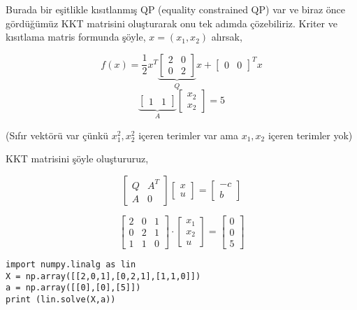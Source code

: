 \documentclass[12pt,fleqn]{article}\usepackage{../../common}
\begin{document}
Burada bir eşitlikle kısıtlanmış QP (equality constrained QP) var ve biraz
önce gördüğümüz KKT matrisini oluşturarak onu tek adımda çözebiliriz. 
Kriter ve kısıtlama matris formunda şöyle, $x = (x_1,x_2)$ alırsak,

$$
f(x) = \frac{1}{2} x^T 
\underbrace{
\left[\begin{array}{cc}
2 & 0 \\ 0 & 2
\end{array}\right]}_{Q} x + 
\left[\begin{array}{cc}
0 & 0
\end{array}\right]^T x
$$
$$
\underbrace{
\left[\begin{array}{cc}
1 & 1
\end{array}\right]}_{A}
\left[\begin{array}{c}
x_2 \\ x_2
\end{array}\right] = 5
$$

(Sıfır vektörü var çünkü $x_1^2,x_2^2$ içeren terimler var ama $x_1,x_2$
içeren terimler yok)

KKT matrisini şöyle oluştururuz, 

$$
\left[\begin{array}{ccc}
Q & A^T \\ A & 0
\end{array}\right]
\left[\begin{array}{c}
x \\ u
\end{array}\right] =
\left[\begin{array}{r}
-c \\ b
\end{array}\right] 
$$

$$
\left[\begin{array}{ccc}
2 & 0 & 1 \\
0 & 2 & 1 \\
1 & 1 & 0
\end{array}\right]
\cdot
\left[\begin{array}{c}
x_1 \\ x_2 \\ u
\end{array}\right] = 
\left[\begin{array}{c}
0 \\ 0 \\ 5
\end{array}\right] 
$$

\begin{verbatim}
import numpy.linalg as lin
X = np.array([[2,0,1],[0,2,1],[1,1,0]]) 
a = np.array([[0],[0],[5]])
print (lin.solve(X,a))
\end{verbatim}
\end{document}
